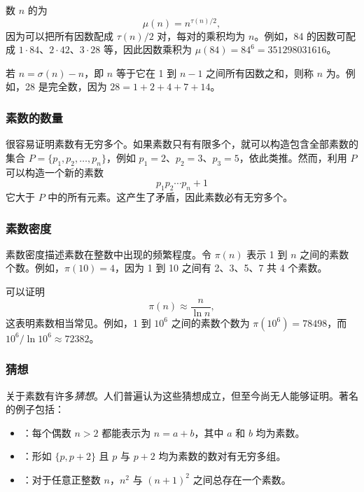 数 $n$ 的为
\[\mu(n)=n^{\tau(n)/2},\]
因为可以把所有因数配成 $\tau(n)/2$ 对，每对的乘积均为 $n$。例如，84 的因数可配成 $1 \cdot 84$、$2 \cdot 42$、$3 \cdot 28$ 等，因此因数乘积为 $\mu(84)=84^6=351298031616$。


若 $n=\sigma(n)-n$，即 $n$ 等于它在 1 到 $n-1$ 之间所有因数之和，则称 $n$ 为。例如，28 是完全数，因为 $28=1+2+4+7+14$。

\subsubsection{素数的数量}

很容易证明素数有无穷多个。如果素数只有有限多个，就可以构造包含全部素数的集合 $P=\{p_1,p_2,\ldots,p_n\}$，例如 $p_1=2$、$p_2=3$、$p_3=5$，依此类推。然而，利用 $P$ 可以构造一个新的素数
\[p_1 p_2 \cdots p_n+1\]
它大于 $P$ 中的所有元素。这产生了矛盾，因此素数必有无穷多个。

\subsubsection{素数密度}

素数密度描述素数在整数中出现的频繁程度。令 $\pi(n)$ 表示 1 到 $n$ 之间的素数个数。例如，$\pi(10)=4$，因为 1 到 10 之间有 2、3、5、7 共 4 个素数。

可以证明
\[\pi(n) \approx \frac{n}{\ln n},\]
这表明素数相当常见。例如，1 到 $10^6$ 之间的素数个数为 $\pi(10^6)=78498$，而 $10^6 / \ln 10^6 \approx 72382$。

\subsubsection{猜想}

关于素数有许多\emph{猜想}。人们普遍认为这些猜想成立，但至今尚无人能够证明。著名的例子包括：

\begin{itemize}
\item {}：每个偶数 $n>2$ 都能表示为 $n=a+b$，其中 $a$ 和 $b$ 均为素数。
\item {}：形如 $\{p,p+2\}$ 且 $p$ 与 $p+2$ 均为素数的数对有无穷多组。
\item {}：对于任意正整数 $n$，$n^2$ 与 $(n+1)^2$ 之间总存在一个素数。
\end{itemize}

